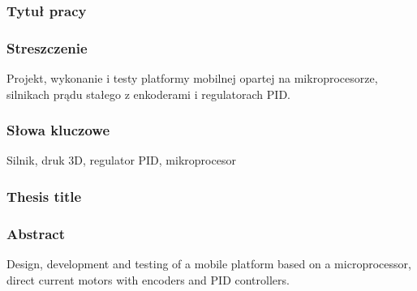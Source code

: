 \documentclass[a4paper,twoside,12pt]{book}
\begin{document}

\frontmatter



  

\cleardoublepage

\rmfamily\normalfont
\pagestyle{empty}


\subsubsection*{Tytuł pracy} 
\Title

\subsubsection*{Streszczenie}  
Projekt, wykonanie i testy platformy mobilnej opartej na mikroprocesorze, silnikach prądu stałego z enkoderami i regulatorach PID.

\subsubsection*{Słowa kluczowe} 
Silnik, druk 3D, regulator PID, mikroprocesor

\subsubsection*{Thesis title} 
\begin{otherlanguage}{british}
\TitleAlt
\end{otherlanguage}

\subsubsection*{Abstract} 
\begin{otherlanguage}{british}
Design, development and testing of a mobile platform based on a microprocessor, direct current motors with encoders and PID controllers.
\end{otherlanguage}
\end{document}
